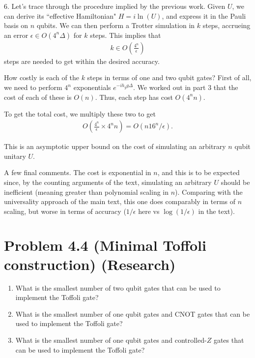 \documentclass{book}
\begin{document}
    6. Let's trace through the procedure implied by the previous work. Given $U$, we can derive its ``effective Hamiltonian" $H = i \ln(U)$, and express it in the Pauli basis on $n$ qubits. We can then perform a Trotter simulation in $k$ steps, accrueing an error $\epsilon \in O(4^n \Delta)$ for $k$ steps. This implies that
    \begin{align}
        k \in O\left(\frac{4^n}{\epsilon}\right)
    \end{align}
    steps are needed to get within the desired accuracy.

    How costly is each of the $k$ steps in terms of one and two qubit gates? First of all, we need to perform $4^n$ exponentials $e^{-ih_g g \Delta}$. We worked out in part 3 that the cost of each of these is $O(n)$. Thus, each step has cost $O(4^n n)$.

    To get the total cost, we multiply these two to get
    \begin{align}
        O\left(\frac{4^n}{\epsilon} \times 4^n n\right) = O(n 16^n/ \epsilon).
    \end{align}

    This is an asymptotic upper bound on the cost of simulating an arbitrary $n$ qubit unitary $U$.

    A few final comments. The cost is exponential in $n$, and this is to be expected since, by the counting arguments of the text, simulating an arbitrary $U$ should be inefficient (meaning greater than polynomial scaling in $n$). Comparing with the universality approach of the main text, this one does comparably in terms of $n$ scaling, but worse in terms of accuracy ($1/\epsilon$ here vs $\log(1/\epsilon)$ in the text). 

\section*{Problem 4.4 (Minimal Toffoli construction) (Research)}
    \begin{enumerate}
        \item What is the smallest number of two qubit gates that can be used to implement the Toffoli gate?
        \item What is the smallest number of one qubit gates and CNOT gates that can be used to implement the Toffoli gate?
        \item What is the smallest number of one qubit gates and controlled-$Z$ gates that can be used to implement the Toffoli gate?
    \end{enumerate}
\end{document}
